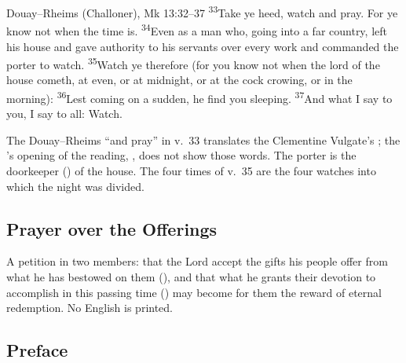 
\begin{englishwitness}{Douay--Rheims (Challoner), Mk 13:32--37}
\textsuperscript{33}Take ye heed, watch and pray. For ye know not when the
time is. \textsuperscript{34}Even as a man who, going into a far country, left
his house and gave authority to his servants over every work and commanded the
porter to watch. \textsuperscript{35}Watch ye therefore (for you know not
when the lord of the house cometh, at even, or at midnight, or at the cock
crowing, or in the morning): \textsuperscript{36}Lest coming on a sudden, he
find you sleeping. \textsuperscript{37}And what I say to you, I say to all:
Watch.
\end{englishwitness}

\noindent The Douay--Rheims ``and pray'' in v.~33 translates the Clementine
Vulgate's ; the 's opening of the reading,
, does not show those words. The porter is the
doorkeeper () of the house. The four times of v.~35 are the
four watches into which the night was divided.

\subsection{Prayer over the Offerings}
\label{proper-prayer-over-offerings}


\noindent A petition in two members: that the Lord accept the gifts his people
offer from what he has bestowed on them (), and that what he grants their devotion to accomplish in this
passing time () may become for them the reward of eternal
redemption. No English is printed.

\subsection{Preface}
\label{proper-preface}

